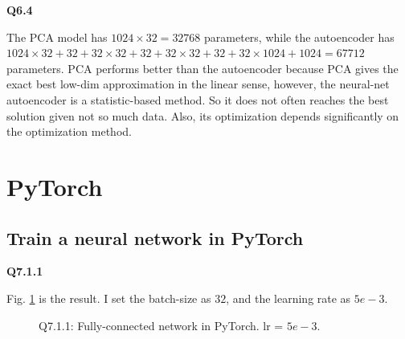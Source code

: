 \documentclass[
  course = {{16-720B Computer Vision}},
  quartile = {{1}},
  assignment = 3-Neural\ Networks\ for\ Recognition,
  name = {{Kangle Deng}},
  email = {{kangled@andrew.cmu.edu}},
  firstexercise = 1
]{aga-homework}
\begin{document}
\noindent \textbf{Q6.4}

The PCA model has $1024 \times 32 = 32768$ parameters, while the autoencoder has $1024 \times 32 + 32 + 32 \times 32 + 32 + 32 \times 32 + 32 + 32 \times 1024 + 1024 = 67712$ parameters. PCA performs better than the autoencoder because PCA gives the exact best low-dim approximation in the linear sense, however, the neural-net autoencoder is a statistic-based method. So it does not often reaches the best solution given not so much data. Also, its optimization depends significantly on the optimization method.

\section{PyTorch}
\subsection{Train a neural network in PyTorch}
\noindent\textbf{Q7.1.1}

Fig. \ref{fig:cv_hw3_q711} is the result. I set the batch-size as $32$, and the learning rate as $5e-3$.

\begin{figure}
    \centering
    \caption{Q7.1.1: Fully-connected network in PyTorch. lr = $5e-3$.}
    \label{fig:cv_hw3_q711}
\end{figure}
\end{document}
